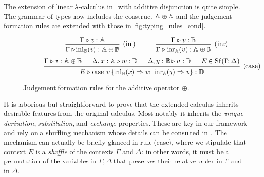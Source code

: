 \documentclass[a4paper,UKenglish,cleveref, autoref, thm-restate]{lipics-v2021}
\begin{document}
The extension of linear $\lambda$-calculus
in~\cite{dahlqvist22,dahlqvist2023syntactic} with additive disjunction is quite
simple. The grammar of types now includes the construct $\mathbb{A} \oplus \mathbb{A}$
and the judgement formation rules are extended with those in
\autoref{fig:typing_rules_cond}. 

\begin{figure}[H]
    \begin{equation*}
            \hspace{60pt}
    \begin{prooftree}
        \hypo{\Gamma \vljud v: \typeA}
        \infer1[(inl)]{\Gamma \vljud \inl_{\typeB}(v): \typeA \oplus \typeB}
    \end{prooftree}
    \hspace{30pt}
    \begin{prooftree}
        \hypo{\Gamma \vljud v: \typeB}
        \infer1[(inr)]{\Gamma \vljud \inr_{\typeA}(v): \typeA \oplus \typeB}
    \end{prooftree} 
    \end{equation*}
    \begin{equation*}
            \hspace{30pt}
    \begin{prooftree}
        \hypo{\Gamma \vljud v: \typeA \oplus \typeB}
        \hypo{\Delta, x: \typeA \vljud w: \typeD}
        \hypo{\Delta, y: \typeB \vljud u: \typeD}
        \hypo{E \in \Shuff(\Gamma; \Delta)}
        \infer4[(case)]{E \vljud \text{case } v\,
        \{\inl_{\typeB}(x) 
            \Rightarrow w ; \,
          \inr_{\typeA}(y) \Rightarrow u
        \}: \typeD}
    \end{prooftree}
    \end{equation*}
    \caption{Judgement formation rules for the additive operator $\oplus$.}
    \label{fig:typing_rules_cond}
\end{figure}
It is laborious but straightforward to prove that the extended calculus
inherits desirable features from the original calculus. Most notably it
inherits the \emph{unique derivation}, \emph{substitution}, and \emph{exchange}
properties.  These are key in our framework and rely on a shuffling mechanism
whose details can be consulted
in~\cite{dahlqvist22,dahlqvist2023syntactic,shulman19}. The mechanism can
actually be briefly glanced in  rule (case), where we stipulate that context
$E$ is a \emph{shuffle} of the contexts $\Gamma$ and $\Delta$: in other words,
it must be a permutation of the variables in $\Gamma,\Delta$ that preserves
their relative order in $\Gamma$ and in $\Delta$.
\end{document}
